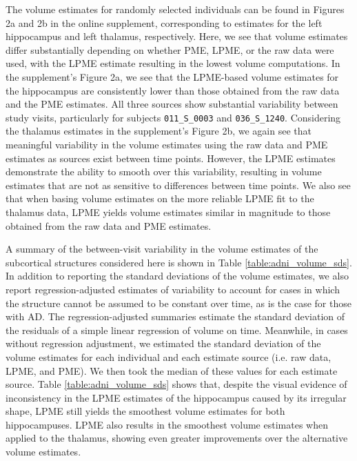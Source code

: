 \documentclass[12pt]{article}
\theoremstyle{definition}
\begin{document}
The volume estimates for randomly selected individuals can be found in Figures 2a and 2b in the online supplement, corresponding to estimates for the left hippocampus and left thalamus, respectively. Here, we see that volume estimates differ substantially depending on whether PME, LPME, or the raw data were used, with the LPME estimate resulting in the lowest volume computations. In the supplement's Figure 2a, we see that the LPME-based volume estimates for the hippocampus are consistently lower than those obtained from the raw data and the PME estimates. All three sources show substantial variability between study visits, particularly for subjects \texttt{011\_S\_0003} and \texttt{036\_S\_1240}. Considering the thalamus estimates in the supplement's Figure 2b, we again see that meaningful variability in the volume estimates using the raw data and PME estimates as sources exist between time points. However, the LPME estimates demonstrate the ability to smooth over this variability, resulting in volume estimates that are not as sensitive to differences between time points. We also see that when basing volume estimates on the more reliable LPME fit to the thalamus data, LPME yields volume estimates similar in magnitude to those obtained from the raw data and PME estimates.

A summary of the between-visit variability in the volume estimates of the subcortical structures considered here is shown in Table \ref{table:adni_volume_sds}. In addition to reporting the standard deviations of the volume estimates, we also report regression-adjusted estimates of variability to account for cases in which the structure cannot be assumed to be constant over time, as is the case for those with AD. The regression-adjusted summaries estimate the standard deviation of the residuals of a simple linear regression of volume on time. Meanwhile, in cases without regression adjustment, we estimated the standard deviation of the volume estimates for each individual and each estimate source (i.e. raw data, LPME, and PME). We then took the median of these values for each estimate source. Table \ref{table:adni_volume_sds} shows that, despite the visual evidence of inconsistency in the LPME estimates of the hippocampus caused by its irregular shape, LPME still yields the smoothest volume estimates for both hippocampuses. LPME also results in the smoothest volume estimates when applied to the thalamus, showing even greater improvements over the alternative volume estimates.
\end{document}
